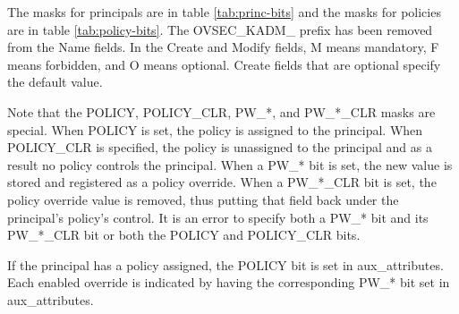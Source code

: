 The masks for principals are in table \ref{tab:princ-bits} and the
masks for policies are in table \ref{tab:policy-bits}.  The
OVSEC_KADM_ prefix has been removed from the Name fields.  In the
Create and Modify fields, M means mandatory, F means forbidden, and O
means optional.  Create fields that are optional specify the default
value.

Note that the POLICY, POLICY_CLR, PW_*, and PW_*_CLR masks are
special.  When POLICY is set, the policy is assigned to the principal.
When POLICY_CLR is specified, the policy is unassigned to the
principal and as a result no policy controls the principal.  When a
PW_* bit is set, the new value is stored and registered as a policy
override.  When a PW_*_CLR bit is set, the policy override value is
removed, thus putting that field back under the principal's policy's
control.  It is an error to specify both a PW_* bit and its PW_*_CLR
bit or both the POLICY and POLICY_CLR bits.

If the principal has a policy assigned, the POLICY bit is set in
aux_attributes.  Each enabled override is indicated by having the
corresponding PW_* bit set in aux_attributes.

